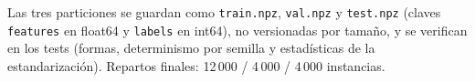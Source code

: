 Las tres particiones se guardan como \texttt{train.npz}, \texttt{val.npz} y \texttt{test.npz} (claves \texttt{features} en float64 y \texttt{labels} en int64), no versionadas por tamaño, y se verifican en los tests (formas, determinismo por semilla y estadísticas de la estandarización). Repartos finales: 12\,000 / 4\,000 / 4\,000 instancias.
